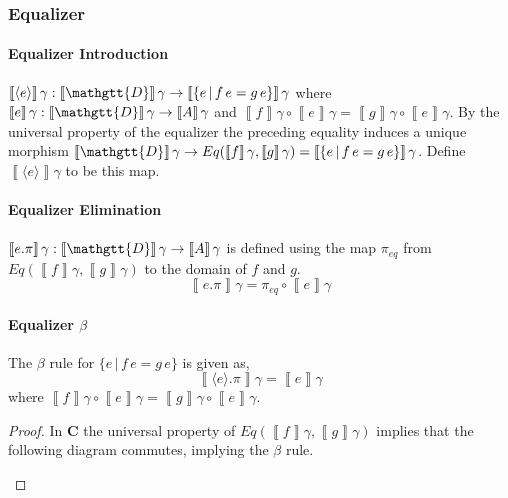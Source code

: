 \documentclass[acmsmall,nonacm]{acmart}
\renewcommand{\Delta}{\mathgtt{D}}
\newcommand{\sem}[1]{\left\llbracket{#1}\right\rrbracket}
\newcommand{\semg}[1]{\sem{#1}\gamma}
\newcommand{\semcat}{\mathbf{C}}
\newcommand{\applto}[2]{#1 \, #2}
\newcommand{\equalizer}[3]{\{#1\,|\,\applto {#2}{#1} = \applto{#3}{#1} \}}
\newcommand{\equalizerin}[1]{\langle #1 \rangle}
\newcommand{\equalizerpi}[1]{#1.\pi}
\begin{document}
\subsubsection{Equalizer}
\paragraph{Equalizer Introduction}
$\semg{\equalizerin{e}} : \semg{\Delta} \to \semg{\equalizer e f g}$ where
$\semg{e} : \semg{\Delta} \to \semg{A}$ and
$\semg{f} \circ \semg{e} = \semg{g} \circ \semg{e}$. By the universal property
of the equalizer the preceding equality induces a unique morphism
$\semg{\Delta} \to Eq(\semg{f} , \semg{g}) = \semg{\equalizer e f g}$. Define
$\semg{\equalizerin{e}}$ to be this map.

\paragraph{Equalizer Elimination}
$\semg{\equalizerpi e} : \semg{\Delta} \to \semg{A}$ is defined using the map
$\pi_{eq}$ from $Eq(\semg{f} , \semg{g})$ to the domain of $f$ and $g$.
\[
  \semg{\equalizerpi e} = \pi_{eq} \circ \semg{e}
\]
\paragraph{Equalizer $\beta$}
The $\beta$ rule for $\equalizer e f g$ is given as,
\[
\semg{\equalizerpi {\equalizerin e}} = \semg{e}
\]
where $\semg{f} \circ \semg{e} = \semg{g} \circ \semg{e}$.
\begin{proof}
  In $\semcat$ the universal property of $Eq(\semg{f}, \semg{g})$ implies that
  the following diagram commutes, implying the $\beta$ rule.

\begin{center}
\end{center}
\end{proof}
\end{document}
